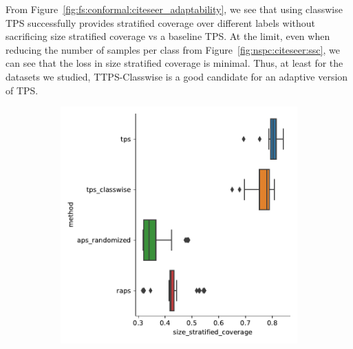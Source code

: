 From Figure~\ref*{fig:fs:conformal:citeseer_adaptability}, we see that using classwise TPS successfully provides stratified coverage over different labels without sacrificing size stratified coverage vs a baseline TPS.
At the limit, even when reducing the number of samples per class from Figure~\ref{fig:nspc:citeseer:ssc}, we can see that the loss in size stratified coverage is minimal.
Thus, at least for the datasets we studied, TTPS-Classwise is a good candidate for an adaptive version of TPS.
\begin{figure}
    \begin{subfigure}{0.48\linewidth}
        \includegraphics[width=\linewidth]{graphConformal/figures/nspc/citeseer_nspc_10_size_stratified_coverage}
    \end{subfigure}
    \begin{subfigure}{0.48\linewidth}

\end{subfigure}
\end{figure}
